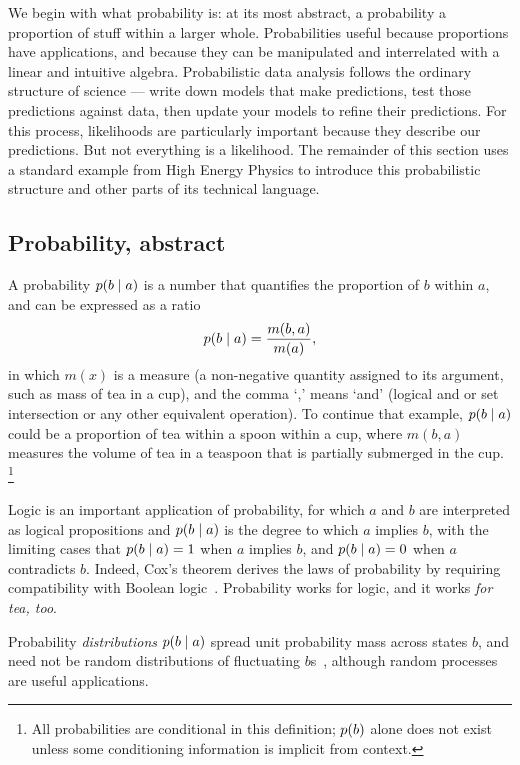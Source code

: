 We begin with what probability is: at its most abstract, a probability a
proportion of stuff within a larger whole.
Probabilities useful because proportions have applications, and because they
can be manipulated and interrelated with a linear and intuitive algebra.
Probabilistic data analysis follows the ordinary structure of science ---
write down models that make predictions, test those predictions against data,
then update your models to refine their predictions.
For this process, likelihoods are particularly important because they describe
our predictions. But not everything is a likelihood.
The remainder of this section uses a standard example from High Energy Physics
to introduce this probabilistic structure and other parts of its technical
language.

\subsection{Probability, abstract}
A probability $p(b \mid a)$ is a number that quantifies the proportion
of $b$ within $a$, and can be expressed as a ratio~\cite{axioms1010038}
\begin{equation}
\label{eqn:searches_prob_ratio}
p(b \mid a) = \frac{m(b, a)}{m(a)},
\end{equation}
in which $m(x)$ is a measure (a non-negative quantity assigned to its
argument, such as mass of tea in a cup), and the comma `,' means `and'
(logical and or set intersection or any other equivalent operation).
To continue that example, $p(b \mid a)$ could be a proportion of tea within
a spoon within a cup, where $m(b, a)$ measures the volume of tea in a
teaspoon that is partially submerged in the cup.%
\footnote{%
All probabilities are conditional in this definition; $p(b)$ alone does
not exist unless some conditioning information is implicit from context.%
}

Logic is an important application of probability, for which $a$ and $b$ are
interpreted as logical propositions and
$p(b \mid a)$ is the degree to which $a$ implies $b$, with the limiting cases
that $p(b \mid a) = 1$ when $a$ implies $b$, and $p(b \mid a) = 0$ when $a$
contradicts $b$.
Indeed, Cox's theorem derives the laws of probability by requiring compatibility
with Boolean logic~\cite{
cox1946probability,
cox1961algebra,
garrett1998nand,
jaynes2003probability,
keynes1920treatise
}.
Probability works for logic, and it works \emph{for tea, too}.

Probability \emph{distributions} $p(b \mid a)$ spread unit probability mass
across states $b$, and need not be random distributions of fluctuating
$b$s~\cite{jaynes2003probability,frankfurt2005on}, although random processes
are useful applications.

